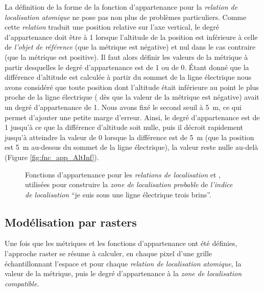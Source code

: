 La définition de la forme de la fonction d'appartenance pour la
\emph{relation de localisation atomique}
 ne pose
pas non plus de problèmes particuliers. Comme cette \emph{relation}
traduit une position relative sur l'axe vertical, le degré
d'appartenance doit être à 1 lorsque l'altitude de la position est
inférieure à celle de \emph{l'objet de référence} (\ie que la métrique
est négative) et nul dans le cas contraire (\ie que la métrique est
positive). Il faut alors définir les valeurs de la métrique à partir
desquelles le degré d'appartenance est de 1 ou de 0. Étant donné que
la différence d'altitude est calculée à partir du sommet de la ligne
électrique nous avons considéré que toute position dont l'altitude
était inférieure au point le plus proche de la ligne électrique (\ie
dès que la valeur de la métrique est négative) avait un degré
d'appartenance de 1. Nous avons fixé le second seuil à \SI{5}{\meter},
ce qui permet d'ajouter une petite marge d'erreur. Ainsi, le degré
d'appartenance est de 1 jusqu’à ce que la différence d'altitude soit
nulle, puis il décroit rapidement jusqu'à atteindre la valeur de 0
lorsque la différence est de \SI{5}{\meter} (\ie que la position est
\SI{5}{\meter} au-dessus du sommet de la ligne électrique), la valeur
reste nulle au-delà (Figure \ref{fig:fnc_app_AltInf}).

\begin{figure}
  \centering
  \subfloat{%
    
    \label{fig:fnc_app_Dist}
  }
  \hfill%
  \subfloat{%
    
    \label{fig:fnc_app_AltInf}
  }
  \caption{Fonctions d'appartenance pour les \emph{relations de
      localisation}
    \protect{}
    et
    \protect{},
    utilisées pour construire la \emph{zone de localisation probable}
    de \emph{l'indice de localisation} \enquote{je suis sous une ligne
      électrique trois brins}.}
  \label{fig:fnc_app_sousProche}
\end{figure}

\subsection{Modélisation par rasters}


Une fois que les métriques et les fonctions d’appartenance ont été
définies, l'approche raster se résume à calculer, en chaque pixel
d'une grille échantillonnant l'espace et pour chaque \emph{relation de
  localisation atomique,} la valeur de la métrique, puis le degré
d'appartenance à la \emph{zone de localisation compatible.}

